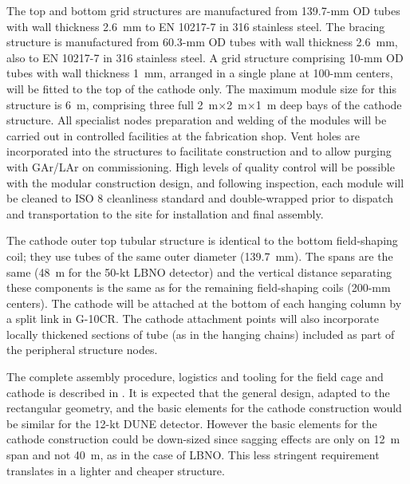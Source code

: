 The top and bottom grid structures are manufactured from 139.7-mm OD tubes with wall thickness  2.6~mm  to EN 10217-7  in 316 stainless steel.  The bracing structure is manufactured from 60.3-mm OD tubes with wall thickness 2.6~mm, also to EN 10217-7 in 316 stainless steel.  A grid structure comprising   10-mm OD tubes with wall thickness 1~mm, arranged in a single plane at 100-mm centers, will be fitted to the top of the cathode only. The maximum module size for this structure is 6~m, comprising three full 2~m$\times$2~m$\times$1~m deep bays of the cathode structure.  All specialist nodes preparation and welding of the modules will be carried out in controlled facilities at the fabrication shop.  Vent holes are incorporated into the structures to
facilitate construction and to allow purging with GAr/LAr on commissioning. High levels of quality control will be possible with the modular construction design, and following inspection, each module will be cleaned to ISO 8 cleanliness standard and double-wrapped prior to dispatch and transportation to the site for installation and final assembly. 

The cathode outer top tubular structure is identical to the bottom field-shaping coil; they use tubes of the same outer diameter
(139.7~mm).  The spans are the same (48~m for the 50-kt LBNO detector) and the vertical distance separating these components is the same as for
the remaining field-shaping coils (200-mm centers). The cathode will be attached at the bottom of each hanging column by a split link in
G-10CR. The cathode attachment points will also incorporate locally thickened sections of tube (as in the hanging chains) included as part
of the peripheral structure nodes.
 
The complete assembly procedure, logistics and tooling for the field cage and cathode is described in \anxlbnob.
It is expected that the general design, adapted to the rectangular geometry, and the basic elements for the cathode construction would be similar for the 12-kt DUNE detector.  However the basic elements for the cathode construction  could be down-sized since sagging effects are only on 12~m span and not 40~m, as in the case of LBNO. This less stringent requirement translates in a lighter and cheaper structure.

